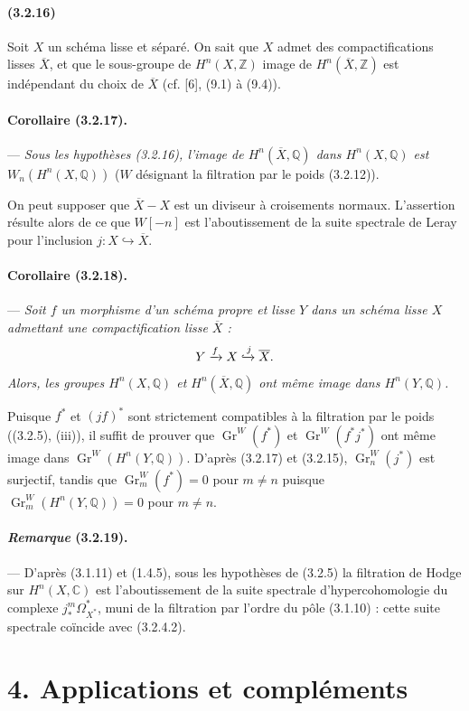 \documentclass[10pt]{article}
\newcommand{\C}{\mathbb C}
\newcommand{\Q}{\mathbb Q}
\newcommand{\Z}{\mathbb Z}
\newcommand{\Gr}{\operatorname{Gr}}
\begin{document}
\paragraph{(3.2.16)} Soit $X$ un schéma lisse et séparé. On sait que $X$ admet des compactifications lisses $\overline X$, et que le sous-groupe de $H^n(X,\Z)$ image de $H^n(\overline X,\Z)$ est indépendant du choix de $\overline X$ (cf. [6], (9.1) à (9.4)).

\paragraph{Corollaire (3.2.17).} --- {\itshape Sous les hypothèses (3.2.16), l'image de $H^n(\overline X,\Q)$ dans $H^n(X,\Q)$ est} $W_n(H^n(X,\Q))$ ($W$ désignant la filtration par le poids (3.2.12)).

On peut supposer que $\overline X-X$ est un diviseur à croisements normaux. L'assertion résulte alors de ce que $W[-n]$ est l'aboutissement de la suite spectrale de Leray pour l'inclusion $j:X\hookrightarrow\overline X$.

\paragraph{Corollaire (3.2.18).} --- {\itshape Soit $f$ un morphisme d'un schéma propre et lisse $Y$ dans un schéma lisse $X$ admettant une compactification lisse $\overline X$ :
\[
Y\xrightarrow{f}X\xhookrightarrow{j}\overline X.
\]
Alors, les groupes $H^n(X,\Q)$ et $H^n(\overline X,\Q)$ ont même image dans $H^n(Y,\Q)$.}

Puisque $f^*$ et $(jf)^*$ sont strictement compatibles à la filtration par le poids ((3.2.5), (iii)), il suffit de prouver que $\Gr^W(f^*)$ et $\Gr^W(f^*j^*)$ ont même image dans $\Gr^W(H^n(Y,\Q))$. D'après (3.2.17) et (3.2.15), $\Gr_n^W(j^*)$ est surjectif, tandis que $\Gr_m^W(f^*)=0$ pour $m\ne n$ puisque $\Gr_m^W(H^n(Y,\Q))=0$ pour $m\ne n$.

\paragraph{\emph{Remarque} (3.2.19).} --- D'après (3.1.11) et (1.4.5), sous les hypothèses de (3.2.5) la filtration de Hodge sur $H^n(X,\C)$ est l'aboutissement de la suite spectrale d'hypercohomologie du complexe $j_*^m\Omega_{X^*}^{*}$, muni de la filtration par l'ordre du pôle (3.1.10) : cette suite spectrale coïncide avec (3.2.4.2).

\section*{4. Applications et compléments}
\end{document}
